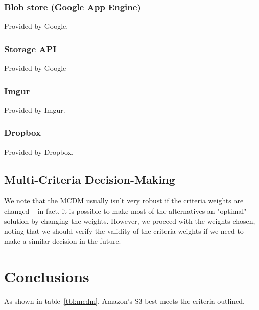 \documentclass[se]{uw-wkrpt}
\begin{document}
\subsubsection{Blob store (Google App Engine)}
Provided by Google.

\subsubsection{Storage API}
Provided by Google

\subsubsection{Imgur}
Provided by Imgur.

\subsubsection{Dropbox}
Provided by Dropbox.

\subsection{Multi-Criteria Decision-Making}
We note that the MCDM usually isn't very robust if the criteria weights are 
changed -- in fact, it is possible to make most of the alternatives an 
"optimal" solution by changing the weights. However, we proceed with the 
weights chosen, noting that we should verify the validity of the criteria 
weights if we need to make a similar decision in the future.

\section{Conclusions}

As shown in table~\ref{tbl:mcdm}, Amazon's S3 best meets the criteria outlined.
\end{document}

